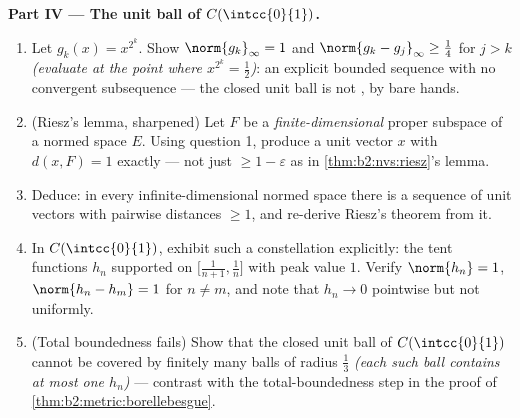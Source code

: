 \begin{problem}
\medskip
\noindent\textbf{Part IV --- The unit ball of
$C(\intcc{0}{1})$.}
\begin{enumerate}[resume]
  \item Let $g_k(x) = x^{2^k}$. Show $\norm{g_k}_\infty = 1$ and
        $\norm{g_k - g_j}_\infty \geq \frac14$ for $j > k$
        \emph{(evaluate at the point where $x^{2^k} =
        \frac12$)}: an explicit bounded sequence with no
        convergent subsequence --- the closed unit ball is not
        , by bare hands.
  \item (Riesz's lemma, sharpened) Let $F$ be a
        \emph{finite-dimensional} proper subspace of a normed
        space $E$. Using question 1, produce a unit vector $x$
        with $d(x, F) = 1$ exactly --- not just $\geq 1 -
        \varepsilon$ as in \cref{thm:b2:nvs:riesz}'s lemma.
  \item Deduce: in every infinite-dimensional normed space there
        is a sequence of unit vectors with pairwise distances
        $\geq 1$, and re-derive Riesz's theorem from it.
  \item In $C(\intcc{0}{1})$, exhibit such a constellation
        explicitly: the tent functions $h_n$ supported on
        $\bigl[\frac1{n+1}, \frac1n\bigr]$ with peak value $1$.
        Verify $\norm{h_n} = 1$, $\norm{h_n - h_m} = 1$ for $n
        \neq m$, and note that $h_n \to 0$ pointwise but not
        uniformly.
  \item (Total boundedness fails) Show that the closed unit ball
        of $C(\intcc{0}{1})$ cannot be covered by finitely many
        balls of radius $\frac13$ \emph{(each such ball contains
        at most one $h_n$)} --- contrast with the
        total-boundedness step in the proof of
        \cref{thm:b2:metric:borellebesgue}.
\end{enumerate}


\end{problem}
